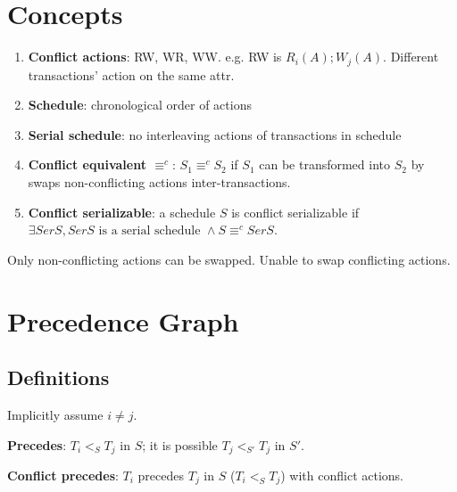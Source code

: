 \documentclass[a4paper]{report}
\begin{document}
\section{Concepts}
\begin{enumerate}
\item \textbf{Conflict actions}: RW, WR, WW. e.g. RW is $R_i(A); W_j(A)$. Different transactions' action on the same attr. 
\item \textbf{Schedule}: chronological order of actions 
\item \textbf{Serial schedule}: no interleaving actions of transactions in schedule
\item \textbf{Conflict equivalent $\equiv^c$}: $S_1 \equiv^c S_2$ if $S_1$ can be transformed into $S_2$ by swaps non-conflicting actions inter-transactions.
\item \textbf{Conflict serializable}: a schedule $S$ is conflict serializable if $\exists SerS, SerS\text{ is a serial schedule } \wedge S\equiv^c SerS$.
\end{enumerate}

Only non-conflicting actions can be swapped. Unable to swap conflicting actions.


\section{Precedence Graph}
\subsection{Definitions}
Implicitly assume $i\neq j$.

\textbf{Precedes}: $T_i <_S T_j$ in $S$; it is possible $T_j <_{S'} T_j$ in $S'$.

\textbf{Conflict precedes}: $T_i$ precedes $T_j$ in $S$ ($T_i <_S T_j$) with conflict actions. 
\end{document}

